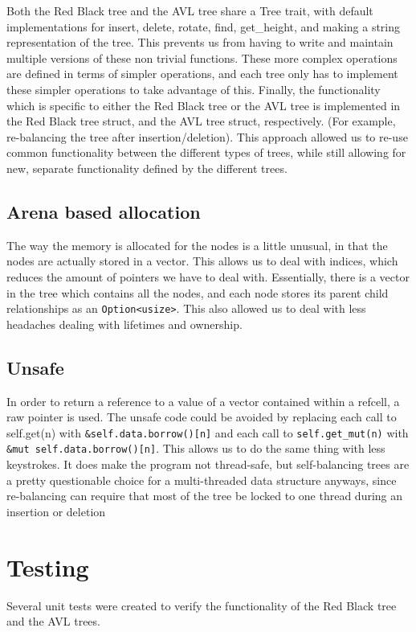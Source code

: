 \documentclass[letterpaper]{article}
\begin{document}
Both the Red Black tree and the AVL tree share a Tree trait, with
default implementations for insert, delete, rotate, find, get\_height,
and making a string representation of the tree. This prevents us from
having to write and maintain multiple versions of these non trivial
functions. These more complex operations are defined in terms of
simpler operations, and each tree only has to implement these simpler
operations to take advantage of this. Finally, the functionality which is
specific to either the Red Black tree or the AVL tree is implemented
in the Red Black tree struct, and the AVL tree struct, respectively.
(For example, re-balancing the tree after insertion/deletion).  This
approach allowed us to re-use common functionality between the
different types of trees, while still allowing for new, separate
functionality defined by the different trees.

\subsection{Arena based allocation}
The way the memory is allocated for the nodes is a little unusual, in that the
nodes are actually stored in a vector. This allows us to deal with indices,
which reduces the amount of pointers we have to deal with. Essentially, there is
a vector in the tree which contains all the nodes, and each node stores its
parent child relationships as an \texttt{Option<usize>}. This also allowed us to
deal with less headaches dealing with lifetimes and ownership.

\subsection{Unsafe}
In order to return a reference to a value of a vector contained within a
refcell, a raw pointer is used. The unsafe code could be avoided by replacing
each call to self.get(n) with \texttt{\&self.data.borrow()[n]} and each call to
\texttt{self.get\_mut(n)} with \texttt{\&mut self.data.borrow()[n]}. This allows
us to do the same thing with less keystrokes. It does make the program not
thread-safe, but self-balancing trees are a pretty questionable choice for a
multi-threaded data structure anyways, since re-balancing can require that most
of the tree be locked to one thread during an insertion or deletion

\section{Testing}
Several unit tests were created to verify the functionality of the Red Black
tree and the AVL trees.
\end{document}
